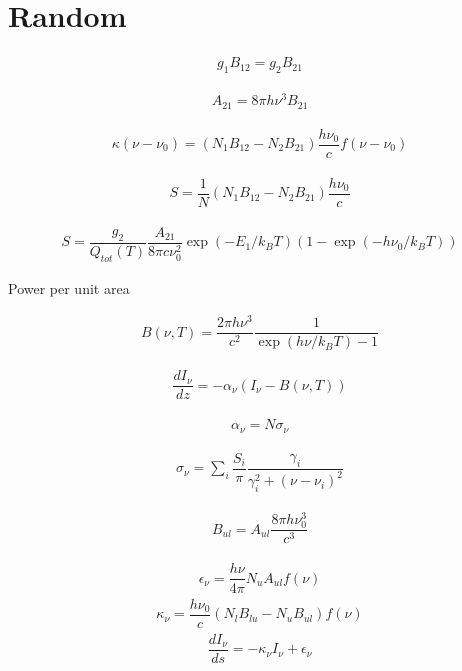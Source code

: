 \section{Random}

\begin{align}
	g_1 B_{12} = g_2 B_{21}
\end{align}

\begin{align}
	A_{21} = 8 \pi h \nu^3 B_{21}
\end{align}

\begin{align}
	\kappa(\nu - \nu_0)	= (N_1 B_{12} - N_2 B_{21}) \dfrac{h \nu_0}{c} f(\nu - \nu_0)
\end{align}

\begin{align}
	S = \dfrac{1}{N} (N_1 B_{12} - N_2 B_{21}) \dfrac{h \nu_0}{c}
\end{align}

\begin{align}
	S = \dfrac{g_2}{Q_{tot}(T)} \dfrac{A_{21}}{8  \pi c \nu_0^2} \exp(- E_1 / k_BT)
		(1 - \exp(- h \nu_0 / k_BT))
\end{align}

Power per unit area

\begin{align}
	B(\nu, T) = \dfrac{2 \pi h \nu^3}{c^2} \dfrac{1}{ \exp(h \nu /  k_B T) - 1}
\end{align}


\begin{align}
	\dfrac{d I_{\nu}}{dz} = -\alpha_{\nu}	 (I_{\nu} - B(\nu, T))
\end{align}

\begin{align}
	\alpha_{\nu} = N \sigma_{\nu}
\end{align}

\begin{align}
	\sigma_{\nu} = \sum_i \dfrac{S_i}{\pi} \dfrac{\gamma_i}{\gamma_i^2 + (\nu - \nu_i)^2}
\end{align}


\begin{align}
	B_{ul} = A_{ul} \dfrac{8 \pi h \nu_0^3}{c^3	}
\end{align}

\begin{align}
	\epsilon_{\nu} = \dfrac{h \nu}{4 \pi} N_u A_{ul} f(\nu)
\end{align}
\begin{align}
	\kappa_{\nu} = \dfrac{h \nu_0}{c} (N_l B_{lu} - N_u B_{ul}) f(\nu)
\end{align}
\begin{align}
	\dfrac{d I_{\nu}}{ds} = - \kappa_{\nu} I_{\nu} + \epsilon_{\nu}
\end{align}


